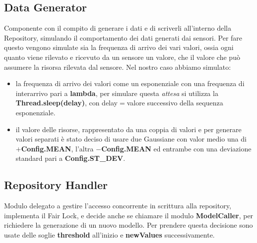    \subsection{Data Generator}
      Componente con il compito di generare i dati e di scriverli all'interno della Repository, simulando il comportamento dei dati generati dai sensori. Per fare questo vengono simulate sia la frequenza di arrivo dei vari valori, ossia ogni quanto viene rilevato e ricevuto da un sensore un valore, che il valore che può assumere la risorsa rilevata dal sensore.\newline
      Nel nostro caso abbiamo simulato:
      \begin{itemize}
        \item la frequenza di arrivo dei valori come un esponenziale con una frequenza di interarrivo pari a \textbf{lambda}, per simulare questa \textit{attesa} si utilizza la \textbf{Thread.sleep(delay)}, con delay$=$valore successivo della sequenza esponenziale.
        \item il valore delle risorse, rappresentato da una coppia di valori e per generare valori separati è stato deciso di usare due Gaussiane con valor medio una di $+$\textbf{Config.MEAN}, l'altra $-$\textbf{Config.MEAN} ed entrambe con una deviazione standard pari a \textbf{Config.ST\_DEV}.
      \end{itemize}
      

    \subsection{Repository Handler}
      Modulo delegato a gestire l'accesso concorrente in scrittura alla repository, implementa il Fair Lock, e decide anche se chiamare il modulo \textbf{ModelCaller}, per richiedere la generazione di un nuovo modello. Per prendere questa decisione sono usate delle soglie \textbf{threshold} all'inizio e \textbf{newValues} successivamente.
      
